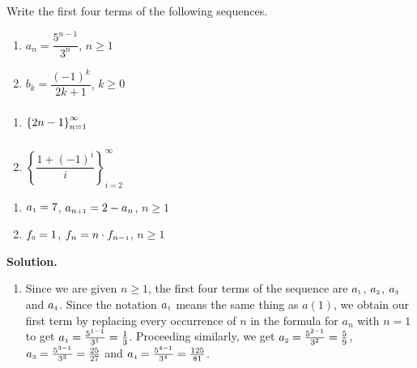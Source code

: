 \documentclass{ximera}
\begin{document}
\begin{ex} \label{seqex1}  Write the first four terms of the following sequences.

\begin{multicols}{2}
\begin{enumerate}


\item  $a_{n} = \dfrac{5^{n-1}}{3^{n}}$, $n \geq 1$

\item  $b_{k} = \dfrac{(-1)^{k}}{2k+1}$, $k \geq 0$

\setcounter{HW}{\value{enumi}}
\end{enumerate}
\end{multicols}

\begin{multicols}{2}
\begin{enumerate}
\setcounter{enumi}{\value{HW}}

\item  $\left\{ 2n - 1 \right\}_{n=1}^{\infty} \vphantom{\left\{\dfrac{1 + (-1)^{i}}{i} \right\}_{i=2}^{\infty}}$

\item  $\left\{\dfrac{1 + (-1)^{i}}{i} \right\}_{i=2}^{\infty}$

\setcounter{HW}{\value{enumi}}
\end{enumerate}
\end{multicols}

\begin{multicols}{2}
\begin{enumerate}
\setcounter{enumi}{\value{HW}}


\item\label{introrecursiveex01}  $a_{\text{\tiny$1$}} = 7$, $a_{n \text{\tiny$ + 1$}} = 2 - a_{n}$, $n \geq 1$

\item  \label{factorialintroex} $f_{\text{\tiny$0$}} = 1$, $f_{n} =n \cdot f_{n-\text{\tiny$1$}}$, $n \geq 1$

\setcounter{HW}{\value{enumi}}
\end{enumerate}
\end{multicols}



{\bf Solution.}

\begin{enumerate}

\item Since we are given $n \geq 1$, the first four terms of the sequence are  $a_{\text{\tiny$1$}}$, $a_{\text{\tiny$2$}}$, $a_{\text{\tiny$3$}}$ and $a_{\text{\tiny$4$}}$.  Since the notation $a_{\text{\tiny$1$}}$ means the same thing as $a(1)$, we obtain our first term by replacing every occurrence of $n$ in the formula for $a_{n}$ with $n=1$ to get  $a_{\text{\tiny$1$}} = \frac{5^{1-1}}{3^{1}} = \frac{1}{3}$.  Proceeding similarly, we get $a_{\text{\tiny$2$}} = \frac{5^{2-1}}{3^{2}} =\frac{5}{9}$, $a_{\text{\tiny$3$}} = \frac{5^{3-1}}{3^{3}} =\frac{25}{27}$ and $a_{\text{\tiny$4$}} = \frac{5^{4-1}}{3^{4}} =\frac{125}{81}$.  


\end{enumerate}
\end{ex}
\end{document}

